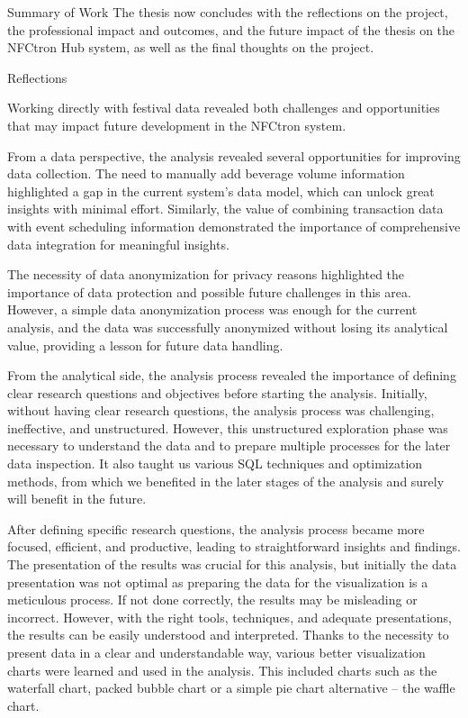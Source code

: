 \begin{section}{Summary of Work}
	The thesis now concludes with the reflections on the project, the professional impact and outcomes, and the future impact of the thesis on the NFCtron Hub system, as well as the final thoughts on the project.
\end{section}

\begin{section}{Reflections}
	\label{sec:conclusion-reflections}

	Working directly with festival data revealed both challenges and opportunities that may impact future development in the NFCtron system.

	From a data perspective, the analysis revealed several opportunities for improving data collection.
	The need to manually add beverage volume information highlighted a gap in the current system's data model, which can unlock great insights with minimal effort.
	Similarly, the value of combining transaction data with event scheduling information demonstrated the importance of comprehensive data integration for meaningful insights.

	The necessity of data anonymization for privacy reasons highlighted the importance of data protection and possible future challenges in this area.
	However, a simple data anonymization process was enough for the current analysis, and the data was successfully anonymized without losing its analytical value, providing a lesson for future data handling.

	From the analytical side, the analysis process revealed the importance of defining clear research questions and objectives before starting the analysis.
	Initially, without having clear research questions, the analysis process was challenging, ineffective, and unstructured.
	However, this unstructured exploration phase was necessary to understand the data and to prepare multiple processes for the later data inspection.
	It also taught us various SQL techniques and optimization methods, from which we benefited in the later stages of the analysis and surely will benefit in the future.

	After defining specific research questions, the analysis process became more focused, efficient, and productive, leading to straightforward insights and findings.
	The presentation of the results was crucial for this analysis, but initially the data presentation was not optimal as preparing the data for the visualization is a meticulous process.
	If not done correctly, the results may be misleading or incorrect.
	However, with the right tools, techniques, and adequate presentations, the results can be easily understood and interpreted.
	Thanks to the necessity to present data in a clear and understandable way, various better visualization charts were learned and used in the analysis.
	This included charts such as the waterfall chart, packed bubble chart or a simple pie chart alternative – the waffle chart.


\end{section}
